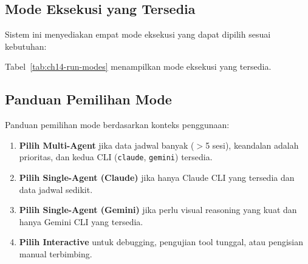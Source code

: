 \subsection{Mode Eksekusi yang Tersedia}

Sistem ini menyediakan empat mode eksekusi yang dapat dipilih sesuai kebutuhan:


Tabel~\ref{tab:ch14-run-modes} menampilkan mode eksekusi yang tersedia.
\begin{table}[h]
\centering
\caption{Mode eksekusi yang tersedia}
\label{tab:ch14-run-modes}
\footnotesize
{}
\normalsize
\end{table}

\subsection{Panduan Pemilihan Mode}

Panduan pemilihan mode berdasarkan konteks penggunaan:
\begin{enumerate}
  \item \textbf{Pilih Multi-Agent} jika data jadwal banyak ($>$5 sesi), keandalan adalah prioritas, dan kedua CLI (\texttt{claude}, \texttt{gemini}) tersedia.
  \item \textbf{Pilih Single-Agent (Claude)} jika hanya Claude CLI yang tersedia dan data jadwal sedikit.
  \item \textbf{Pilih Single-Agent (Gemini)} jika perlu visual reasoning yang kuat dan hanya Gemini CLI yang tersedia.
  \item \textbf{Pilih Interactive} untuk debugging, pengujian tool tunggal, atau pengisian manual terbimbing.
\end{enumerate}

